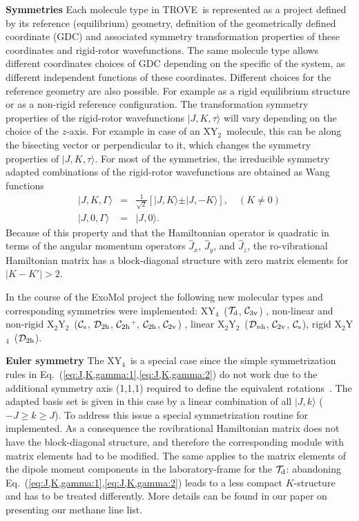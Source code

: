 \documentclass[12pt]{article}
\newcommand{\trove}{{\sc TROVE}}
\newcommand{\ket}[1]{\vert #1 \rangle  }
\newcommand{\Cv}[1]{${\mathcal C}_{#1{\rm v}}$}
\newcommand{\Dh}[1]{${\mathcal D}_{#1{\rm h}}$}
\newcommand{\Ch}[1]{${\mathcal C}_{#1{\rm h}}$}
\newcommand{\Td}{${\mathcal T}_{\rm d}$}
\newcommand{\Cs}{${\mathcal C}_{\rm s}$}
\newcommand{\2}{$_{2}$}
\newcommand{\3}{$_{3}$}
\newcommand{\4}{$_{4}$}
\begin{document}
\textbf{Symmetries} Each molecule type in \trove\ is represented as a project defined by its reference (equilibrium) geometry, definition of the geometrically defined coordinate (GDC) and associated symmetry transformation properties of these coordinates and rigid-rotor wavefunctions. The same molecule type allows different coordinates choices of GDC depending on the specific of the system, as different independent functions of these coordinates. Different choices for the reference geometry are also possible. For example as a rigid equilibrium structure or as a non-rigid reference configuration. The transformation symmetry properties of the rigid-rotor wavefunctions $\ket{J,K,\tau}$ \cite{05YuCaJe.NH3} will vary depending on the choice of the $z$-axis. For example in case of an XY\2\ molecule, this can be along the bisecting vector or perpendicular to it, which changes the symmetry properties of $\ket{J,K,\tau}$. For most of the symmetries, the irreducible symmetry adapted combinations of the rigid-rotor wavefunctions are obtained as Wang functions
\begin{eqnarray}
\label{eq:J,K,gamma:1}
\ket{J,K,\Gamma} &=& \frac{1}{\sqrt{2}} \left[ \ket{J,K} \pm \ket{J,-K}  \right],  \quad (K\ne 0) \\
\label{eq:J,K,gamma:2}
\ket{J,0,\Gamma} &=& \ket{J,0}.
\end{eqnarray}
Because of this property and that the Hamiltonnian operator is quadratic in terms of the angular  momentum operators $\hat{J}_x$, $\hat{J}_y$,  and $\hat{J}_z$, the ro-vibrational Hamiltonian matrix has a block-diagonal structure with zero matrix elements for $|K-K'|>2$.

In the course of the ExoMol project the following new molecular types and corresponding symmetries were implemented:   XY\4\ (\Td, \Cv{3}) \cite{13YuTeBa.CH4,14YuTeBa.CH4}, non-linear and non-rigid  X\2Y\2\ (\Cs, \Dh{2}, \Ch{2}$^{+}$, \Ch{2}, \Cv{2}) \cite{13PoKoMa.H2O2,15AlOvPo.H2O2}, linear X\2Y\2\ (\Dh{n}, \Cv{2}, \Cs), rigid X\2Y\4\ (\Dh{2}).

\textbf{Euler symmetry}
The XY\4\ is a special case since the simple
symmetrization rules in
Eq.~(\ref{eq:J,K,gamma:1},\ref{eq:J,K,gamma:2}) do not work
\cite{11AlLeCa.CH4} due to the additional symmetry axis (1,1,1)
required to define the equivalent rotations~\cite{99BuJexx.CH4}. The
adapted basis set is given in this case by a linear combination of all
$\ket{J,k}$ ($-J \ge k \ge J$). To address this issue a special
symmetrization routine for implemented. As a consequence the
rovibrational Hamiltonian matrix does not have the block-diagonal
structure, and therefore the corresponding module with matrix elements
had to be modified. The same applies to the matrix elements of the
dipole moment components in the laboratory-frame for the \Td:
abandoning Eq.~(\ref{eq:J,K,gamma:1},\ref{eq:J,K,gamma:2}) leads to a
less compact $K$-structure and has to be treated differently. More
details can be found in our paper on presenting our methane line
list\cite{jt564}.
\end{document}
